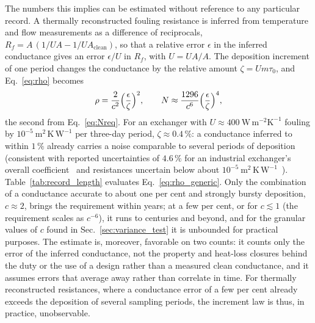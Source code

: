 \documentclass[preprint,12pt]{elsarticle}
\begin{document}
The numbers this implies can be estimated without reference to any particular
record. A thermally reconstructed fouling resistance is inferred from
temperature and flow measurements as a difference of reciprocals,
$R_f=A\,(1/UA-1/UA_{\mathrm{clean}})$, so that a relative error $\epsilon$ in
the inferred conductance gives an error $\epsilon/U$ in $R_f$, with $U=UA/A$. The
deposition increment of one period changes the conductance by the relative
amount $\zeta=U m\tau_0$, and Eq.~\eqref{eq:rho} becomes
\begin{equation}
  \rho=\frac{2}{c^{2}}\Bigl(\frac{\epsilon}{\zeta}\Bigr)^{2},
  \qquad
  N\approx\frac{1296}{c^{6}}\Bigl(\frac{\epsilon}{\zeta}\Bigr)^{4},
  \label{eq:rho_generic}
\end{equation}
the second from Eq.~\eqref{eq:Nreq}. For an exchanger with
$U\approx400~\mathrm{W\,m^{-2}K^{-1}}$ fouling by
$10^{-5}~\mathrm{m^{2}\,K\,W^{-1}}$ per three-day period, $\zeta\approx0.4\,\%$:
a conductance inferred to within $1\,\%$ already carries a noise comparable to
several periods of deposition (consistent with reported uncertainties of
$4.6\,\%$ for an industrial exchanger's overall
coefficient~\cite{Fguiri2020} and resistances uncertain below about
$10^{-5}~\mathrm{m^{2}\,K\,W^{-1}}$~\cite{Shen2015}).
Table~\ref{tab:record_length} evaluates
Eq.~\eqref{eq:rho_generic}. Only the combination of a conductance accurate to
about one per cent and strongly bursty deposition, $c\approx2$, brings the
requirement within years; at a few per cent, or for $c\lesssim1$ (the requirement
scales as $c^{-6}$), it runs to centuries and beyond, and for the granular values of $c$ found in
Sec.~\ref{sec:variance_test} it is unbounded for practical purposes. The
estimate is, moreover, favorable on two counts: it counts only the error of
the inferred conductance, not the property and heat-loss closures behind
the duty or the use of a design rather than a measured clean conductance, and
it assumes errors that average away rather than correlate in time. For
thermally reconstructed resistances, where a conductance error of a few per
cent already exceeds the deposition of several sampling periods, the
increment law is thus, in practice, unobservable.
\end{document}
